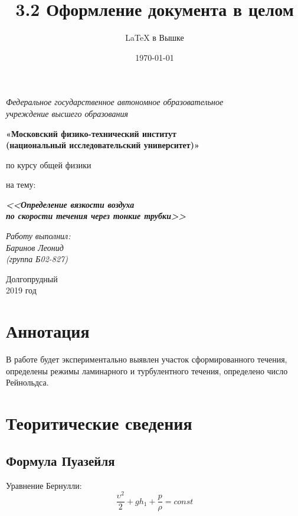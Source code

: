 \documentclass[a4paper,12pt]{article}
\author{\LaTeX{} в Вышке}
\title{3.2 Оформление документа в целом}
\date{\today}
\theoremstyle{plain} %
\theoremstyle{definition} %
\theoremstyle{remark} %
\begin{document}
\thispagestyle{empty}
\begin{center}
	\textit{Федеральное государственное автономное образовательное\\ учреждение высшего образования }
	\vspace{0.5ex}
	
	\textbf{«Московский физико-технический институт\\ (национальный исследовательский университет)»}
\end{center}
\vspace{10ex}
\begin{center}
	\vspace{13ex}
	\vspace{1ex}
	
	по курсу общей физики
	
	
	на тему:
	
	\textbf{\textit{<<Определение вязкости воздуха\\ по скорости течения через тонкие трубки>>}}
	\vspace{30ex}
	\begin{flushright}
		\noindent
		\textit{Работу выполнил:}
		\\
		\textit{Баринов Леонид \\(группа Б02-827)}
	\end{flushright}
	\vfill
	Долгопрудный \\2019 год
\end{center}

\newpage
\setcounter{page}{1}
\section{Аннотация}
В работе будет экспериментально выявлен участок сформированного течения, определены режимы ламинарного и турбулентного течения, определено число Рейнольдса.
\section{Теоритические сведения}
\subsection{Формула Пуазейля}
Уравнение Бернулли:
\begin{equation}
\frac{\upsilon^2}{2}+gh_1+\frac{p}{\rho} = const
\end{equation}
\end{document}
